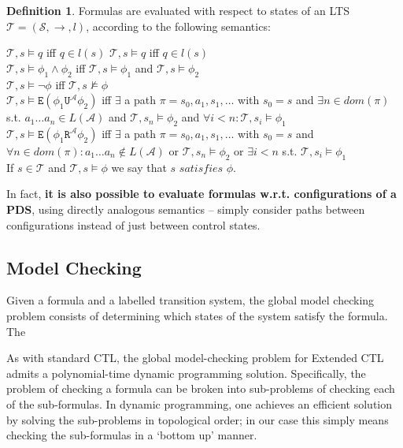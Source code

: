 \documentclass[11pt]{article}
\theoremstyle{definition}
\newtheorem{mydef}{Definition}
\begin{document}
\begin{mydef}
Formulas are evaluated with respect to states of an LTS $\mathcal{T} = (\mathcal{S},
\rightarrow, l)$, according to the following semantics:

$\mathcal{T}, s \models q$ iff $q \in l(s)$
$\mathcal{T}, s \models q$ iff $q \in l(s)$ \\
$\mathcal{T}, s \models \phi_1 \wedge \phi_2$ iff $\mathcal{T}, s \models \phi_1$
and $\mathcal{T}, s \models \phi_2$ \\
$\mathcal{T}, s \models \neg \phi $ iff $\mathcal{T}, s \not\models \phi$ \\
$\mathcal{T}, s \models \texttt{E}(\phi_1 \texttt{U}^\mathcal{A} \phi_2) $ iff 
$\exists$ a path $\pi = s_0, a_1, s_1, \dots$ with $s_0 = s$ and $\exists n \in dom(\pi)$ s.t. $a_1 \dots a_n \in L(\mathcal{A})$ and $\mathcal{T}, s_n \models \phi_2$ and $\forall i < n : \mathcal{T}, s_i \models \phi_1$
\\ %
$\mathcal{T}, s \models \texttt{E}(\phi_1 \texttt{R}^\mathcal{A} \phi_2) $ iff 
$\exists$ a path $\pi = s_0, a_1, s_1, \dots$ with $s_0 = s$ and $\forall n \in dom(\pi): a_1 \dots a_n \not\in L(\mathcal{A})$ or $\mathcal{T}, s_n \models \phi_2$ or $\exists i < n$ s.t. $\mathcal{T}, s_i \models \phi_1$\\ 

If $s \in \mathcal{T}$ and $\mathcal{T}, s \models \phi$ we say that $s \textit{ satisfies } \phi$.
\end{mydef}

In fact, \textbf{it is also possible to evaluate formulas w.r.t. configurations of a
PDS}, using directly analogous semantics -- simply consider paths between
configurations instead of just between control states. 

\subsection{Model Checking}

Given a formula and a labelled transition system, the global model checking
problem consists of determining which states of the system satisfy the formula.
The %

As with standard CTL, the global model-checking problem for Extended CTL admits
a polynomial-time dynamic programming solution.  Specifically, the problem of
checking a formula can be broken into sub-problems of checking each of the
sub-formulas.  In dynamic programming, one achieves an efficient solution by
solving the sub-problems in topological order; in our case this simply means
checking the sub-formulas in a `bottom up' manner.
\end{document}
